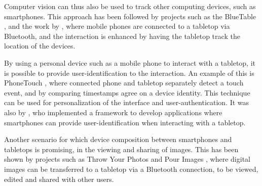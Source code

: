 Computer vision can thus also be used to track other computing devices, such as smartphones.
This approach has been followed by projects such as the BlueTable \citep{Wilson:2007:bluetable}, and the work by \cite{Echtler:2008:tracking}, where mobile phones are connected to a tabletop via Bluetooth, and the interaction is enhanced by having the tabletop track the location of the devices.

By using a personal device such as a mobile phone to interact with a tabletop, it is possible to provide user-identification to the interaction.
An example of this is PhoneTouch \citep{Schmidt:2010:phonetouch}, where connected phone and tabletop separately detect a touch event, and by comparing timestamps agree on a device identity.
This technique can be used for personalization of the interface and user-authentication.
It was also by \cite{Berglund:2011:nai}, who implemented a framework to develop applications where smartphones can provide user-identification when interacting with a tabletop.

Another scenario for which device composition between smartphones and tabletops is promising, in the viewing and sharing of images.
This has been shown by projects such as Throw Your Photos \citep{Chehimi:2010:throwphotos} and Pour Images \citep{Esbensen:2010:pourimages}, where digital images can be transferred to a tabletop via a Bluetooth connection, to be viewed, edited and shared with other users.

%



